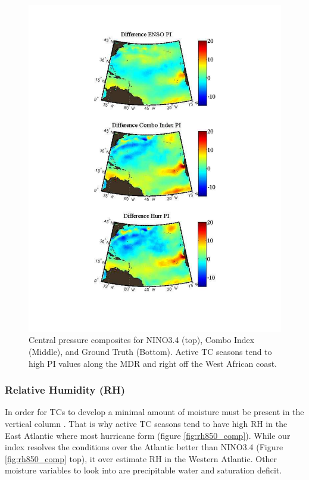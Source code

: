 \documentclass[]{article}
\begin{document}
\begin{figure}[ht]
\begin{minipage}[b]{0.55\linewidth}
\includegraphics[width=\textwidth]{figures/comboIndex/composites/compareMDRCompositesPI.pdf}
\caption{Central pressure composites for NINO3.4 (top), Combo Index (Middle), and Ground Truth (Bottom). Active TC seasons tend to high PI values along the MDR and right off the West African coast.}
\label{fig:pi_comp}
\end{minipage}
\end{figure}

\subsubsection{Relative Humidity (RH)}
In order for TCs to develop a minimal amount of moisture must be present in the vertical column \cite{emanuel1999}. That is why active TC seasons tend to have high RH in the East Atlantic where most hurricane form (figure \ref{fig:rh850_comp}). While our index resolves the conditions over the Atlantic better than NINO3.4 (Figure \ref{fig:rh850_comp} top), it over estimate RH in the Western Atlantic. Other moisture variables to look into are precipitable water and saturation deficit. 
\end{document}
